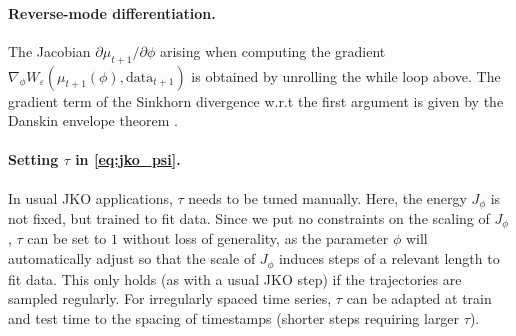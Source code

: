 \paragraph{Reverse-mode differentiation.} The Jacobian $\partial \mu_{t+1} / \partial\phi$ arising when computing the gradient $\nabla_\phi W_\varepsilon(\mu_{t+1}(\phi), \mathrm{data}_{t+1})$ is obtained by unrolling the while loop above. The gradient term of the Sinkhorn divergence w.r.t the first argument is given by the Danskin envelope theorem \citep{danskin2012theory}.


\paragraph{Setting $\tau$ in \eqref{eq:jko_psi}.} 
In usual \acrshort{JKO} applications, $\tau$ needs to be tuned manually. Here, the energy $J_\phi$ is not fixed, but trained to fit data. Since we put no constraints on the scaling of $J_\phi$, $\tau$ can be set to $1$ without loss of generality, as the parameter $\phi$ will automatically adjust so that the scale of $J_\phi$ induces steps of a relevant length to fit data. This only holds (as with a usual \acrshort{JKO} step) if the trajectories are sampled regularly. For irregularly spaced time series, $\tau$ can be adapted at train and test time to the spacing of timestamps (shorter steps requiring larger $\tau$).


